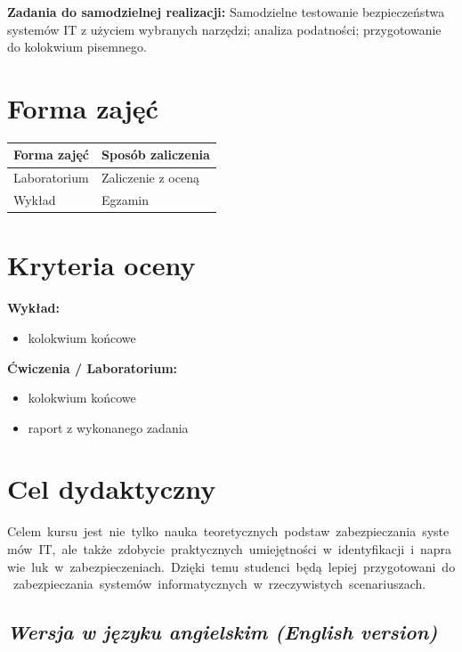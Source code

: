\documentclass[12pt, a4paper]{article}
\newcommand{\thdrule}{\noalign{\global\setlength{\extrarowheight}{0pt}}}
\newcommand{\thdend}{\noalign{\global\setlength{\extrarowheight}{3pt}}}
\begin{document}
\vspace{4pt}
\noindent\textbf{Zadania do samodzielnej realizacji:} Samodzielne testowanie bezpieczeństwa systemów IT z użyciem wybranych narzędzi; analiza podatności; przygotowanie do kolokwium pisemnego.

\section{Forma zajęć}

\begin{center}
{\scriptsize
\begin{tabular}{m{5cm}m{8cm}}
\thdrule\toprule
\rowcolor{pjatkRed} {\color{white}\textbf{Forma zajęć}} & {\color{white}\textbf{Sposób zaliczenia}} \\
\midrule\thdend
  \rowcolor{tableRowLight} Laboratorium & Zaliczenie z oceną \\
  \rowcolor{tableRowAlt} Wykład & Egzamin \\
\bottomrule
\end{tabular}}
\end{center}

\section{Kryteria oceny}

\textbf{Wykład:}
\begin{itemize}
  \item kolokwium końcowe
\end{itemize}
\vspace{4pt}
\textbf{Ćwiczenia / Laboratorium:}
\begin{itemize}
  \item kolokwium końcowe
  \item raport z wykonanego zadania
\end{itemize}


\section{Cel dydaktyczny}

Celem kursu jest nie tylko nauka teoretycznych podstaw zabezpieczania systemów IT, ale także zdobycie praktycznych umiejętności w identyfikacji i naprawie luk w zabezpieczeniach. Dzięki temu studenci będą lepiej przygotowani do zabezpieczania systemów informatycznych w rzeczywistych scenariuszach.

\subsection*{\textit{Wersja w języku angielskim (English version)}}
\end{document}
